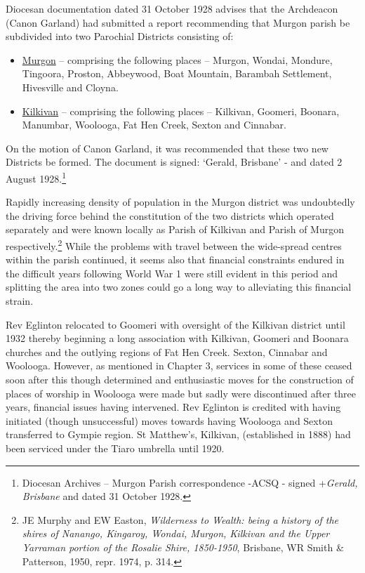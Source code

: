 Diocesan documentation dated 31 October 1928 advises that the Archdeacon (Canon Garland) had submitted a report recommending that Murgon parish be subdivided into two Parochial Districts consisting of:

\begin{itemize}
\item
  \underline{Murgon} -- comprising the following places -- Murgon, Wondai, Mondure, Tingoora, Proston, Abbeywood, Boat Mountain, Barambah Settlement, Hivesville and Cloyna.
\item
  \underline{Kilkivan} -- comprising the following places -- Kilkivan, Goomeri, Boonara, Manumbar, Woolooga, Fat Hen Creek, Sexton and Cinnabar.
\end{itemize}

On the motion of Canon Garland, it was recommended that these two new Districts be formed. The document is signed: `Gerald, Brisbane' - and dated 2 August 1928.\footnote{Diocesan Archives -- Murgon Parish correspondence -ACSQ - signed +\emph{Gerald, Brisbane} and dated 31 October 1928.}

Rapidly increasing density of population in the Murgon district was undoubtedly the driving force behind the constitution of the two districts which operated separately and were known locally as Parish of Kilkivan and Parish of Murgon respectively.\footnote{JE Murphy and EW Easton, \emph{Wilderness to Wealth: being a history of the shires of Nanango, Kingaroy, Wondai, Murgon, Kilkivan and the Upper Yarraman portion of the Rosalie Shire, 1850-1950}, Brisbane, WR Smith \& Patterson, 1950, repr. 1974, p. 314.} While the problems with travel between the wide-spread centres within the parish continued, it seems also that financial constraints endured in the difficult years following World War 1 were still evident in this period and splitting the area into two zones could go a long way to alleviating this financial strain.

Rev Eglinton relocated to Goomeri with oversight of the Kilkivan district until 1932 thereby beginning a long association with Kilkivan, Goomeri and Boonara churches and the outlying regions of Fat Hen Creek. Sexton, Cinnabar and Woolooga. However, as mentioned in Chapter 3, services in some of these ceased soon after this though determined and enthusiastic moves for the construction of places of worship in Woolooga were made but sadly were discontinued after three years, financial issues having intervened. Rev Eglinton is credited with having initiated (though unsuccessful) moves towards having Woolooga and Sexton transferred to Gympie region. St Matthew's, Kilkivan, (established in 1888) had been serviced under the Tiaro umbrella until 1920.

